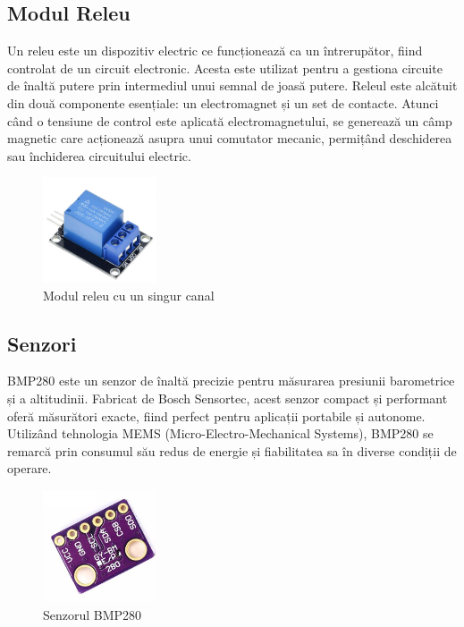 \subsection{Modul Releu}
Un releu este un dispozitiv electric ce funcționează ca un întrerupător, fiind controlat de un circuit electronic. Acesta este utilizat pentru a gestiona circuite de înaltă putere prin intermediul unui semnal de joasă putere. Releul este alcătuit din două componente esențiale: un electromagnet și un set de contacte. Atunci când o tensiune de control este aplicată electromagnetului, se generează un câmp magnetic care acționează asupra unui comutator mecanic, permițând deschiderea sau închiderea circuitului electric.

\begin{figure}[H]
\includegraphics[width=0.3\textwidth, height=0.3\textwidth]{images/releu.png}
\caption{Modul releu cu un singur canal\cite{releu_poza}}
\label{fig:releu}
\end{figure}

\subsection{Senzori}
BMP280 este un senzor de înaltă precizie pentru măsurarea presiunii barometrice și a altitudinii. Fabricat de Bosch Sensortec, acest senzor compact și performant oferă măsurători exacte, fiind perfect pentru aplicații portabile și autonome. Utilizând tehnologia MEMS (Micro-Electro-Mechanical Systems), BMP280 se remarcă prin consumul său redus de energie și fiabilitatea sa în diverse condiții de operare.

\begin{figure}[H]
\includegraphics[width=0.3\textwidth, height=0.3\textwidth]{images/bmp.png}
\caption{Senzorul BMP280\cite{bmp_poza}}
\label{fig:bmp}
\end{figure}

